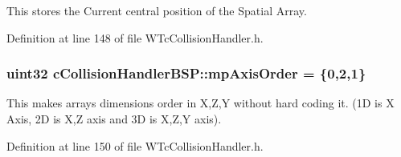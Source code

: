This stores the Current central position of the Spatial Array. 



Definition at line 148 of file WTcCollisionHandler.h.

\hypertarget{classc_collision_handler_b_s_p_a521e19fe8bb2a85bda87223955b2f696}{
\subsubsection[{mpAxisOrder}]{\setlength{\rightskip}{0pt plus 5cm}uint32 {\bf cCollisionHandlerBSP::mpAxisOrder} = \{0,2,1\}}}
\label{classc_collision_handler_b_s_p_a521e19fe8bb2a85bda87223955b2f696}


This makes arrays dimensions order in X,Z,Y without hard coding it. (1D is X Axis, 2D is X,Z axis and 3D is X,Z,Y axis). 



Definition at line 150 of file WTcCollisionHandler.h.

